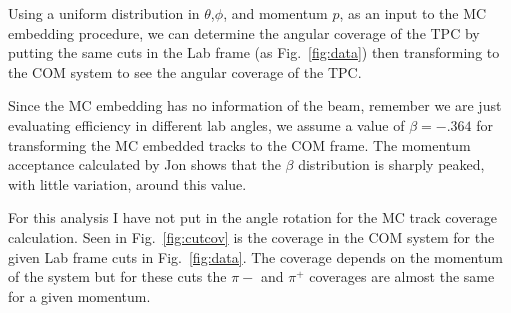 \documentclass[12pt, letterpaper, twoside]{article}
\begin{document}
 Using a uniform distribution in $\theta$,$\phi$, and momentum $p$, as an input to the MC embedding procedure, we can determine the angular coverage of the TPC by putting the same cuts in the Lab frame (as Fig.~\ref{fig:data}) then transforming to the COM system to see the angular coverage of the TPC.
 
 Since the MC embedding has no information of the beam, remember we are just evaluating efficiency in different lab angles, we assume a value of $\beta = -.364$ for transforming the MC embedded tracks to the COM frame. The momentum acceptance calculated by Jon shows that the $\beta$ distribution is sharply peaked, with little variation, around this value. 
 
For this analysis I have not put in the angle rotation for the MC track coverage calculation. Seen in Fig.~\ref{fig:cutcov} is the coverage in the COM system for the given Lab frame cuts in Fig.~\ref{fig:data}. The coverage depends on the momentum of the system but for these cuts the $\pi{-}$ and $\pi^+$ coverages are almost the same for a given momentum. 
\end{document}
